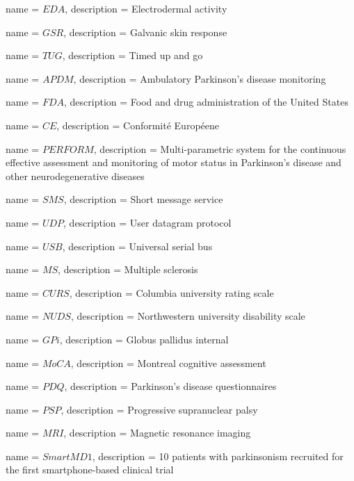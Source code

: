 {
	name = $EDA$, 
	description = Electrodermal activity
}

{
	name = $GSR$, 
	description = Galvanic skin response
}

{
	name = $TUG$, 
	description = Timed up and go
}

{
	name = $APDM$, 
	description = Ambulatory Parkinson's disease monitoring
}

{
	name = $FDA$, 
	description = Food and drug administration of the United States
}

{
	name = $CE$, 
	description = Conformité Européene
}

{
	name = $PERFORM$, 
	description = Multi-parametric system for the continuous effective assessment and monitoring of motor status in Parkinson's disease and other neurodegenerative diseases
}

{
	name = $SMS$, 
	description = Short message service
}

{
	name = $UDP$, 
	description = User datagram protocol
}

{
	name = $USB$, 
	description = Universal serial bus
}

{
	name = $MS$, 
	description = Multiple sclerosis
}

{
	name = $CURS$, 
	description = Columbia university rating scale
}

{
	name = $NUDS$, 
	description = Northwestern university disability scale
}

{
	name = $GPi$, 
	description = Globus pallidus internal
}

{
	name = $MoCA$, 
	description = Montreal cognitive assessment
}

{
	name = $PDQ$, 
	description = Parkinson's disease questionnaires
}

{
	name = $PSP$, 
	description = Progressive supranuclear palsy
}

{
	name = $MRI$, 
	description = Magnetic resonance imaging
}

{
	name = $SmartMD1$, 
	description = 10 patients with parkinsonism recruited for the first smartphone-based clinical trial
}

